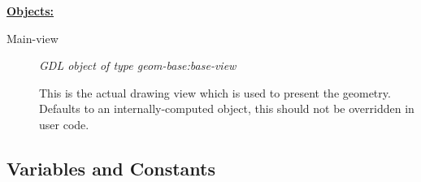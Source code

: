 \documentclass [11pt]{book}
\begin{document}
\begin{itemize}
\begin{description}
\end{description}






\textbf{
\underline{Objects:}}

\begin{description}

\item [Main-view]
\emph{GDL object of type geom-base:base-view}

 This is the actual drawing view which is used to present the geometry. Defaults to an
internally-computed object, this should not be overridden in user code.




\end{description}







\end{itemize}



\subsection{Variables and Constants}

\label{subsec:variablesandconstants}
\end{document}
